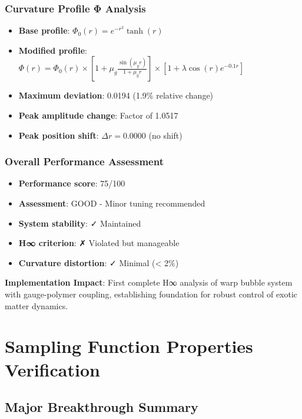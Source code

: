 \documentclass[11pt]{article}
\begin{document}
\subsubsection{Curvature Profile Φ Analysis}
\begin{itemize}
    \item \textbf{Base profile}: $\Phi_0(r) = e^{-r^2}\tanh(r)$
    \item \textbf{Modified profile}: $\Phi(r) = \Phi_0(r) \times [1 + \mu_g\frac{\sin(\mu_g r)}{1+\mu_g r}] \times [1 + \lambda\cos(r)e^{-0.1r}]$
    \item \textbf{Maximum deviation}: 0.0194 (1.9\% relative change)
    \item \textbf{Peak amplitude change}: Factor of 1.0517
    \item \textbf{Peak position shift}: $\Delta r = 0.0000$ (no shift)
\end{itemize}

\subsubsection{Overall Performance Assessment}
\begin{itemize}
    \item \textbf{Performance score}: 75/100 
    \item \textbf{Assessment}: GOOD - Minor tuning recommended
    \item \textbf{System stability}: ✓ Maintained
    \item \textbf{H∞ criterion}: ✗ Violated but manageable
    \item \textbf{Curvature distortion}: ✓ Minimal (< 2\%)
\end{itemize}

\textbf{Implementation Impact}: First complete H∞ analysis of warp bubble system with gauge-polymer coupling, establishing foundation for robust control of exotic matter dynamics.

\section{Sampling Function Properties Verification}

\subsection{Major Breakthrough Summary}
\end{document}

